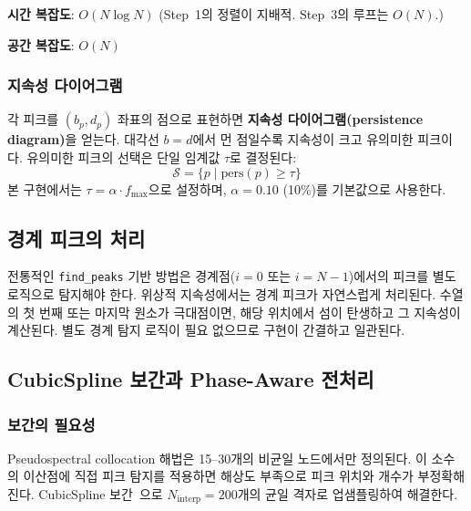 \documentclass[11pt]{article}
\begin{document}
\textbf{시간 복잡도}: $O(N \log N)$ (Step~1의 정렬이 지배적. Step~3의 루프는 $O(N)$.)

\textbf{공간 복잡도}: $O(N)$

\subsubsection{지속성 다이어그램}

각 피크를 $(b_p, d_p)$ 좌표의 점으로 표현하면 \textbf{지속성 다이어그램(persistence diagram)}을 얻는다.
대각선 $b = d$에서 먼 점일수록 지속성이 크고 유의미한 피크이다.
유의미한 피크의 선택은 단일 임계값 $\tau$로 결정된다:
\begin{equation}
  \mathcal{S} = \{p \mid \mathrm{pers}(p) \geq \tau\}
  \label{eq:significant}
\end{equation}
본 구현에서는 $\tau = \alpha \cdot f_{\max}$으로 설정하며, $\alpha = 0.10$ (10\%)를 기본값으로 사용한다.

\subsection{경계 피크의 처리}

전통적인 \texttt{find\_peaks} 기반 방법은 경계점($i = 0$ 또는 $i = N-1$)에서의 피크를 별도 로직으로 탐지해야 한다.
위상적 지속성에서는 경계 피크가 자연스럽게 처리된다.
수열의 첫 번째 또는 마지막 원소가 극대점이면, 해당 위치에서 섬이 탄생하고 그 지속성이 계산된다.
별도 경계 탐지 로직이 필요 없으므로 구현이 간결하고 일관된다.

\subsection{CubicSpline 보간과 Phase-Aware 전처리}

\subsubsection{보간의 필요성}

Pseudospectral collocation 해법은 15--30개의 비균일 노드에서만 정의된다.
이 소수의 이산점에 직접 피크 탐지를 적용하면 해상도 부족으로 피크 위치와 개수가 부정확해진다.
CubicSpline 보간~\cite{deBoor2001}으로 $N_{\mathrm{interp}} = 200$개의 균일 격자로 업샘플링하여 해결한다.
\end{document}
